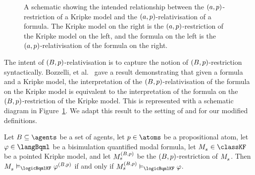 \begin{figure}
    \centering
    \caption{A schematic showing the intended relationship between the $(a, p)$-restriction of a Kripke model and the $(a, p)$-relativisation of a formula. The Kripke model on the right is the $(a, p)$-restriction of the Kripke model on the left, and the formula on the left is the $(a, p)$-relativisation of the formula on the right.}\label{rml-k4-relativisation-restriction-diagram}
\end{figure}

The intent of $(B, p)$-relativisation is to capture the notion of $(B, p)$-restriction syntactically.
Bozzelli, et al.~\cite{bozzelli:2014b} gave a result demonstrating that given a \langBqml{} formula and a Kripke model, the interpretation of the $(B, p)$-relativisation of the formula on the Kripke model is equivalent to the interpretation of the formula on the $(B, p)$-restriction of the Kripke model.
This is represented with a schematic diagram in Figure~\ref{rml-k4-relativisation-restriction-diagram}.
We adapt this result to the setting of \classKF{} and for our modified definitions.

\begin{lemma}\label{rml-k4-relativisation-restriction}
Let $\agentsB \subseteq \agents$ be a set of agents, let $\atomP \in \atoms$ be a propositional atom, let $\phi \in \langBqml$ be a bisimulation quantified modal formula, let $\kPModel{\kStateS} \in \classKF$ be a pointed Kripke model, and let $\kPModel[(\agentsB, \atomP)]{\kStateS}$ be the $(B, p)$-restriction of $\kPModel{\kStateS}$.
Then $\kPModel{\kStateS} \entails_\logicBqmlKF \phi^{(\agentsB, \atomP)}$ if and only if $\kPModel[(\agentsB, \atomP)]{\kStateS} \entails_\logicBqmlKF \phi$.
\end{lemma}

